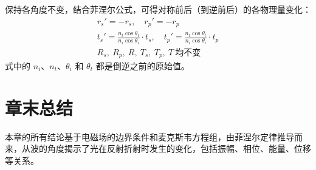 \documentclass[UTF8]{report}
\theoremstyle{MyLineTheoremStyle} %
\theoremstyle{MyBlockTheoremStyle} %
\theoremstyle{MySubsubsectionStyle} %
\begin{document}
保持各角度不变，结合菲涅尔公式，可得对称前后（到逆前后）的各物理量变化：
\begin{gather}
r_s' = -r_s,\quad r_p' = -r_p \\ 
t_s' = \frac{n_t \cos \theta_t}{n_i \cos \theta_i} \cdot t_s,\quad t_p' = \frac{n_t \cos \theta_t}{n_i \cos \theta_i} \cdot t_p \\
R_s,\ R_p,\ R,\ T_s,\ T_p,\ T \ \text{均不变}
\end{gather}
式中的 $n_i$、$n_t$、$\theta_i$ 和 $\theta_t$ 都是倒逆之前的原始值。


\section{章末总结}

本章的所有结论基于电磁场的边界条件和麦克斯韦方程组，由菲涅尔定律推导而来，从波的角度揭示了光在反射折射时发生的变化，包括振幅、相位、能量、位移等关系。
\end{document}
